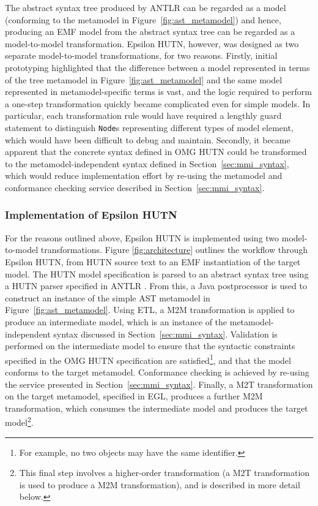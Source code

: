 The abstract syntax tree produced by ANTLR can be regarded as a model (conforming to the metamodel in Figure~\ref{fig:ast_metamodel}) and hence, producing an EMF model from the abstract syntax tree can be regarded as a model-to-model transformation. Epsilon HUTN, however, was designed as two separate model-to-model transformations, for two reasons. Firstly, initial prototyping highlighted that the difference between a model represented in terms of the tree metamodel in Figure~\ref{fig:ast_metamodel} and the same model represented in metamodel-specific terms is vast, and the logic required to perform a one-step transformation quickly became complicated even for simple models. In particular, each transformation rule would have required a lengthly guard statement to distinguish \texttt{Node}s representing different types of model element, which would have been difficult to debug and maintain. Secondly, it became apparent that the concrete syntax defined in OMG HUTN could be transformed to the metamodel-independent syntax defined in Section~\ref{sec:mmi_syntax}, which would reduce implementation effort by re-using the metamodel and conformance checking service described in Section~\ref{sec:mmi_syntax}.

\subsubsection{Implementation of Epsilon HUTN}
For the reasons outlined above, Epsilon HUTN is implemented using two model-to-model transformations. Figure \ref{fig:architecture} outlines the workflow through Epsilon HUTN, from HUTN source text to an EMF instantiation of the target model. The HUTN model specification is parsed to an abstract syntax tree using a HUTN parser specified in ANTLR \cite{parr07antlr}. From this, a Java postprocessor is used to construct an instance of the simple AST metamodel in Figure~\ref{fig:ast_metamodel}. Using ETL, a M2M transformation is applied to produce an intermediate model, which is an instance of the metamodel-independent syntax discussed in Section~\ref{sec:mmi_syntax}. Validation is performed on the intermediate model to ensure that the syntactic constraints specified in the OMG HUTN specification are satisfied\footnote{For example, no two objects may have the same identifier.}, and that the model conforms to the target metamodel. Conformance checking is achieved by re-using the service presented in Section~\ref{sec:mmi_syntax}. Finally, a M2T transformation on the target metamodel, specified in EGL, produces a further M2M transformation, which consumes the intermediate model and produces the target model\footnote{This final step involves a higher-order transformation (a M2T transformation is used to produce a M2M transformation), and is described in more detail below.}.

